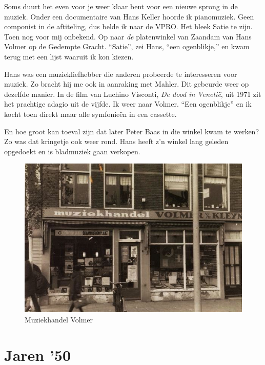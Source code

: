 \documentclass[12pt,twoside, openright]{memoir}
\begin{document}

Soms duurt het even voor je weer klaar bent voor een nieuwe sprong in de muziek. Onder een documentaire van Hans Keller hoorde ik pianomuziek. Geen componist in de aftiteling, dus belde ik naar de VPRO. Het bleek Satie te zijn. Toen nog voor mij onbekend. Op naar \emph{de} platenwinkel van Zaandam van Hans Volmer op de Gedempte Gracht. ``Satie'', zei Hans, ``een ogenblikje,'' en kwam terug met een lijst waaruit ik kon kiezen. 

Hans was een muziekliefhebber die anderen probeerde te interesseren voor muziek. Zo bracht hij me ook in aanraking met Mahler. Dit gebeurde weer op dezelfde manier. In de film van Luchino Visconti, \emph{De dood in Venetië}, uit 1971 zit het prachtige adagio uit de vijfde. Ik weer naar Volmer. ``Een ogenblikje'' en ik kocht toen direkt maar alle symfonieën in een cassette.

En hoe groot kan toeval zijn dat later Peter Baas in die winkel kwam te werken? Zo was dat kringetje ook weer rond. Hans heeft z'n winkel lang geleden opgedoekt en is bladmuziek gaan verkopen.

\begin{figure}
\centering
\includegraphics[width=\textwidth]{img/97volmer}
\caption*{\footnotesize Muziekhandel Volmer}
\end{figure}


\section*{Jaren '50} %
\label{cha:jaren50}
\end{document}
